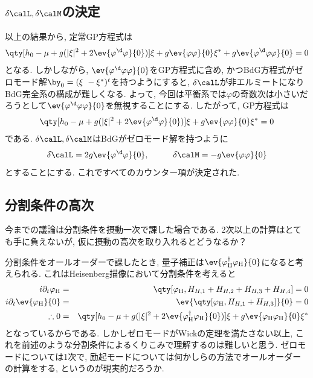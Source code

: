 \documentclass[10.5pt,a4paper]{jreport}
\begin{document}
\subsection{$\delta\calL, \delta\calM$の決定}
以上の結果から, 定常GP方程式は
\begin{eqnarray}
  \qty[ h_0 -\mu + g(|\xi|^2+2\ev{\varphi^\d\varphi}{0})]\xi + g\ev{\varphi\varphi}{0}\xi^* + g\ev{\varphi^\d\varphi\varphi}{0} = 0
\end{eqnarray}
となる. しかしながら, $\ev{\varphi^\d\varphi\varphi}{0}$をGP方程式に含め, かつBdG方程式がゼロモード解$\by_0 = (\xi\ -\xi^*)^t$を持つようにすると, $\delta\calL$が非エルミートになりBdG完全系の構成が難しくなる. よって, 今回は平衡系では$\varphi$の奇数次は小さいだろうとして$\ev{\varphi^\d\varphi\varphi}{0}$を無視することにする. したがって, GP方程式は
\begin{eqnarray}
  \qty[ h_0 -\mu + g(|\xi|^2+2\ev{\varphi^\d\varphi}{0})]\xi + g\ev{\varphi\varphi}{0}\xi^* = 0
\end{eqnarray}
である. $\delta\calL, \delta\calM$はBdGがゼロモード解を持つように
\begin{eqnarray}
  \delta\calL = 2g\ev{\varphi^\d\varphi}{0},\hspace{1cm} \delta\calM = -g\ev{\varphi\varphi}{0}
\end{eqnarray}
とすることにする. これですべてのカウンター項が決定された.
\subsection{分割条件の高次}
今までの議論は分割条件を摂動一次で課した場合である. 2次以上の計算はとても手に負えないが, 仮に摂動の高次を取り入れるとどうなるか？

分割条件をオールオーダーで課したとき, 量子補正は$\ev{\varphi_{\rm H}^\dagger\varphi_{\rm H}}{0}$になると考えられる. これはHeisenberg描像において分割条件を考えると
\begin{eqnarray}
  i\partial_t \varphi_{\rm H} &=& \qty[\varphi_{\rm H}, H_{H, 1} + H_{H, 2} + H_{H, 3} + H_{H, 4} ] = 0\\
  i\partial_t \ev{\varphi_{\rm H}}{0} &=& \ev{\qty[\varphi_{\rm H}, H_{H, 1} +  H_{H, 3}] }{0} = 0\\
  \therefore 0 &=& \qty[h_0 - \mu +  g(|\xi|^2 + 2\ev{\varphi_{\rm H}^\dagger\varphi_{\rm H}}{0})]\xi + g\ev{\varphi_{\rm H}\varphi_{\rm H}}{0}\xi^*
\end{eqnarray}
となっているからである. しかしゼロモードがWickの定理を満たさない以上, これを前述のような分割条件によるくりこみで理解するのは難しいと思う. ゼロモードについては1次で, 励起モードについては何かしらの方法でオールオーダーの計算をする, というのが現実的だろうか. 
\end{document}
